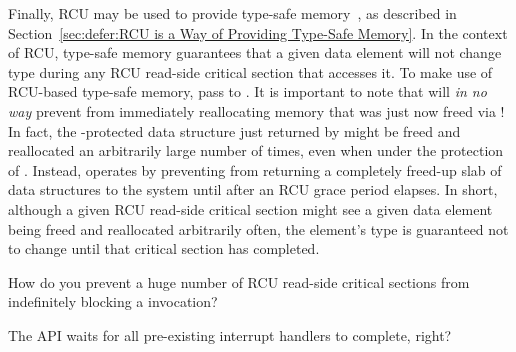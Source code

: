 Finally, RCU may be used to provide
type-safe memory~\cite{Cheriton96a}, as described in
Section~\ref{sec:defer:RCU is a Way of Providing Type-Safe Memory}.
In the context of RCU, type-safe memory guarantees that a given
data element will not change type during any RCU read-side critical section
that accesses it.
To make use of RCU-based type-safe memory, pass
 to .
It is important to note that  will
\emph{in no way}
prevent  from immediately reallocating
memory that was just now freed via !
In fact, the -protected data structure
just returned by  might be freed and reallocated
an arbitrarily large number of times, even when under the protection
of .
Instead,  operates by preventing
from returning a completely freed-up slab of data structures
to the system until after an RCU grace period elapses.
In short, although a given RCU read-side critical section might see a
given  data element being freed and reallocated
arbitrarily often, the element's type is guaranteed not to change until
that critical section has completed.

\QuickQuiz{}
	How do you prevent a huge number of RCU read-side critical
	sections from indefinitely blocking a 
	invocation?
 \QuickQuizEnd

\QuickQuiz{}
	The  API waits for all pre-existing
	interrupt handlers to complete, right?
 \QuickQuizEnd


